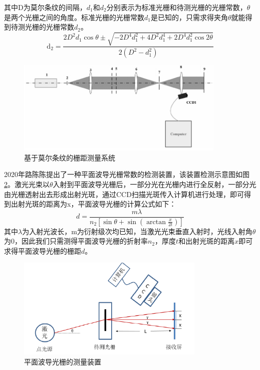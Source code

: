 \documentclass[type=master,oneside]{fduthesis}
\begin{document}
其中D为莫尔条纹的间隔，$d_{1}$和$d_{2}$分别表示为标准光栅和待测光栅的光栅常数，$\theta $是两个光栅之间的角度。标准光栅的光栅常数$d_{1}$是已知的，只需求得夹角$\theta $就能得到待测光栅的光栅常数$d_{2}$。
\begin{equation}
  \mathrm{d_{2}}=\frac{2 D^{2} d_{1} \cos \theta \pm \sqrt{-2 D^{4} d_{1}^{2}+4 D^{2} d_{1}^{4}+2 D^{4} d_{1}^{2} \cos 2 \theta}}{2\left(D^{2}-d_{1}^{2}\right)}
\end{equation}

\begin{figure}[htb]
  \centering
  \includegraphics[width=10cm]{1-fig/莫尔条纹.png}
  \caption{基于莫尔条纹的栅距测量系统}
  \label{fig:基于莫尔条纹的栅距测量系统}
\end{figure}


2020年路陈陈\cite{路陈陈2020平面波导光栅常数检测装置的研究}提出了一种平面波导光栅常数的检测装置，该装置检测示意图如图\ref{fig:平面波导光栅的测量装置}。激光光束以$\theta $入射到平面波导光栅后，一部分光在光栅内进行全反射，一部分光由光栅透射出去形成出射光斑，通过CCD扫描光斑传入计算机进行处理，即可得到出射光斑的距离为x，平面波导光栅的计算公式如下：
\begin{equation}
  d=\frac{m \lambda}{n_{2}\left[\sin \theta+\sin \left(\arctan \frac{x}{2 t}\right)\right]}
\end{equation}
其中$\lambda $为入射光波长，m为衍射级次均已知，当激光光束垂直入射时，光线入射角$\theta $为0，因此我们只需测得平面波导光栅的折射率$ n_{2}$，厚度$ t$和出射光斑的距离$ x$即可求得平面波导光栅的栅距$ d$。
\begin{figure}[htb]
  \centering
  \includegraphics[width=9cm]{1-fig/平面波导光栅的测量装置.png}
  \caption{平面波导光栅的测量装置}
  \label{fig:平面波导光栅的测量装置}
\end{figure}
\end{document}
